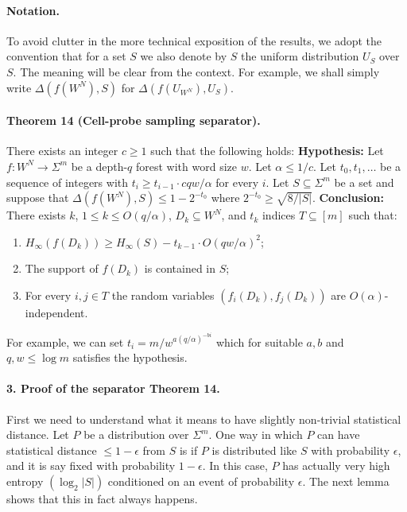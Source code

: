 \documentclass[10pt,a4paper]{article}
\begin{document}
\paragraph{Notation.}
To avoid clutter in the more technical exposition of the results, we adopt the convention that for a set $S$ we also denote by $S$ the uniform distribution $U_S$ over $S$. The meaning will be clear from the context. For example, we shall simply write $\Delta(f(W^N),S)$ for $\Delta(f(U_{W^N}),U_S)$.

\paragraph{Theorem 14 (Cell-probe sampling separator).}
There exists an integer $c\geq1$ such that the following holds:
\textbf{Hypothesis:} Let $f:W^N\to\Sigma^m$ be a depth-$q$ forest with word size $w$. Let $\alpha\leq1/c$. Let $t_0,t_1,\ldots$ be a sequence of integers with $t_i\geq t_{i-1}\cdot cqw/\alpha$ for every $i$. Let $S\subseteq\Sigma^m$ be a set and suppose that $\Delta(f(W^N),S)\leq1-2^{-t_0}$ where $2^{-t_0}\geq\sqrt{8/|S|}$.
\textbf{Conclusion:} There exists $k$, $1\leq k\leq O(q/\alpha)$, $D_k\subseteq W^N$, and $t_k$ indices $T\subseteq[m]$ such that:
\begin{enumerate}
\item[(0)] $H_\infty(f(D_k))\geq H_\infty(S)-t_{k-1}\cdot O(qw/\alpha)^2$;
\item[(1)] The support of $f(D_k)$ is contained in $S$;
\item[(2)] For every $i,j\in T$ the random variables $(f_i(D_k),f_j(D_k))$ are $O(\alpha)$-independent.
\end{enumerate}
For example, we can set $t_i=m/w^{a(q/\alpha)^{-bi}}$ which for suitable $a,b$ and $q,w\leq\log m$ satisfies the hypothesis.

\paragraph{3. Proof of the separator Theorem 14.}
First we need to understand what it means to have slightly non-trivial statistical distance. Let $P$ be a distribution over $\Sigma^m$. One way in which $P$ can have statistical distance $\leq1-\epsilon$ from $S$ is if $P$ is distributed like $S$ with probability $\epsilon$, and it is say fixed with probability $1-\epsilon$. In this case, $P$ has actually very high entropy $(\log_2|S|)$ conditioned on an event of probability $\epsilon$. The next lemma shows that this in fact always happens.
\end{document}
